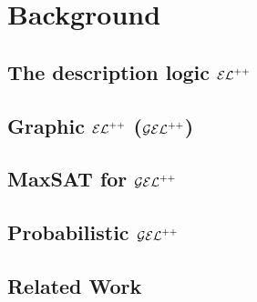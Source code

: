 
\chapter{Background}
\label{cap:background}

\section{The description logic \texorpdfstring{$\mathcal{EL}^{++}$}{𝓔𝓛++}}

\section{Graphic \texorpdfstring{$\mathcal{EL}^{++}$}{𝓔𝓛++} (\texorpdfstring{$\mathcal{GEL}^{++}$}{𝓖𝓔𝓛++})}

\section{MaxSAT for \texorpdfstring{$\mathcal{GEL}^{++}$}{𝓖𝓔𝓛++}}

\section{Probabilistic \texorpdfstring{$\mathcal{GEL}^{++}$}{𝓖𝓔𝓛++}}

\section{Related Work}